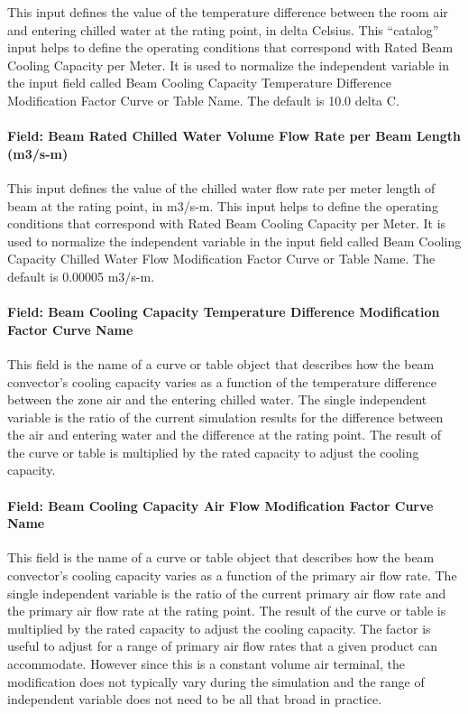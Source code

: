 This input defines the value of the temperature difference between the room air and entering chilled water at the rating point, in delta Celsius. This ``catalog'' input helps to define the operating conditions that correspond with Rated Beam Cooling Capacity per Meter. It is used to normalize the independent variable in the input field called Beam Cooling Capacity Temperature Difference Modification Factor Curve or Table Name. The default is 10.0 delta C.

\paragraph{Field: Beam Rated Chilled Water Volume Flow Rate per Beam Length (m3/s-m)}\label{field-beam-rated-chilled-water-volume-flow-rate-per-beam-length-m3s-m}

This input defines the value of the chilled water flow rate per meter length of beam at the rating point, in m3/s-m. This input helps to define the operating conditions that correspond with Rated Beam Cooling Capacity per Meter. It is used to normalize the independent variable in the input field called Beam Cooling Capacity Chilled Water Flow Modification Factor Curve or Table Name. The default is 0.00005 m3/s-m.

\paragraph{Field: Beam Cooling Capacity Temperature Difference Modification Factor Curve Name}\label{field-beam-cooling-capacity-temperature-difference-modification-factor-curve-name}

This field is the name of a curve or table object that describes how the beam convector's cooling capacity varies as a function of the temperature difference between the zone air and the entering chilled water. The single independent variable is the ratio of the current simulation results for the difference between the air and entering water and the difference at the rating point. The result of the curve or table is multiplied by the rated capacity to adjust the cooling capacity.

\paragraph{Field: Beam Cooling Capacity Air Flow Modification Factor Curve Name}\label{field-beam-cooling-capacity-air-flow-modification-factor-curve-name}

This field is the name of a curve or table object that describes how the beam convector's cooling capacity varies as a function of the primary air flow rate. The single independent variable is the ratio of the current primary air flow rate and the primary air flow rate at the rating point. The result of the curve or table is multiplied by the rated capacity to adjust the cooling capacity. The factor is useful to adjust for a range of primary air flow rates that a given product can accommodate. However since this is a constant volume air terminal, the modification does not typically vary during the simulation and the range of independent variable does not need to be all that broad in practice.

